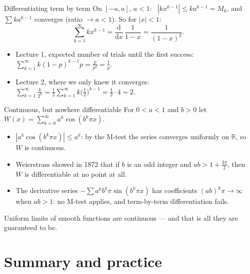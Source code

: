 \documentclass{wosm-slides}
\newcommand{\R}{\mathbb{R}}
\begin{document}
\begin{frame}{Differentiating term by term}
  On $[-a, a]$, $a < 1$: \ $|k x^{k-1}| \le k a^{k-1} = M_k$, and $\sum k a^{k-1}$ converges
  (ratio $\to a < 1$). So for $|x| < 1$:
  \[ \sum_{k=1}^\infty k x^{k-1} = \frac{\mathrm{d}}{\mathrm{d}x}\,\frac{1}{1-x} = \frac{1}{(1-x)^2} . \]
  \pause
  \begin{example}
    \begin{itemize}
      \item Lecture 1, expected number of trials until the first success:
        $\sum_{k=1}^\infty k (1-p)^{k-1} p = \frac{p}{p^2} = \frac1p$.
      \item Lecture 2, where we only knew it converges:
        $\sum_{k=1}^\infty \frac{k}{2^k} = \frac12 \sum_{k=1}^\infty k \bigl(\frac12\bigr)^{k-1}
        = \frac12 \cdot 4 = 2$.
    \end{itemize}
  \end{example}
\end{frame}

\begin{frame}{Continuous, but nowhere differentiable}
  For $0 < a < 1$ and $b > 0$ let \
  $W(x) = \sum_{k=0}^\infty a^k \cos(b^k \pi x)$.
  \begin{itemize}
    \item $|a^k \cos(b^k \pi x)| \le a^k$: by the M-test the series converges uniformly on
      $\R$, so $W$ is continuous.
    \item Weierstrass showed in 1872 that if $b$ is an odd integer and
      $ab > 1 + \frac{3\pi}{2}$, then $W$ is differentiable at no point at all.
    \item The derivative series $-\sum a^k b^k \pi \sin(b^k \pi x)$ has coefficients
      $(ab)^k \pi \to \infty$ when $ab > 1$: no M-test applies, and term-by-term
      differentiation fails.
  \end{itemize}
  \pause
  Uniform limits of smooth functions are continuous --- and that is all they are
  guaranteed to be.
\end{frame}

\section{Summary and practice}
\end{document}
